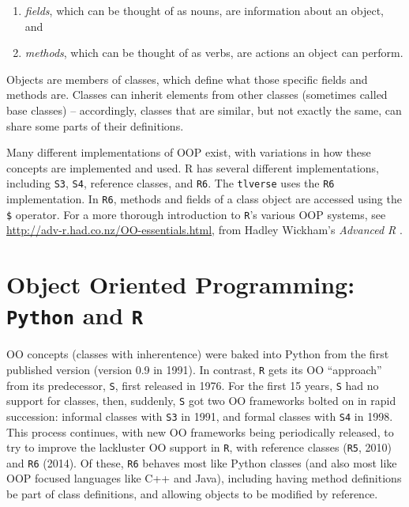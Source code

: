 \documentclass[
  12pt, krantz2,
]{krantz}
\newcommand{\passthrough}[1]{#1}
\providecommand{\tightlist}{%
  \setlength{\itemsep}{0pt}\setlength{\parskip}{0pt}}
\newcommand{\1}{\mathbbm{1}}
\theoremstyle{definition}
\theoremstyle{definition}
\theoremstyle{definition}
\theoremstyle{definition}
\theoremstyle{remark}
\begin{document}
\begin{enumerate}
\def\labelenumi{\arabic{enumi}.}
\tightlist
\item
  \emph{fields}, which can be thought of as nouns, are information about an object,
  and
\item
  \emph{methods}, which can be thought of as verbs, are actions an object can
  perform.
\end{enumerate}

Objects are members of classes, which define what those specific fields and
methods are. Classes can inherit elements from other classes (sometimes called
base classes) -- accordingly, classes that are similar, but not exactly the
same, can share some parts of their definitions.

Many different implementations of OOP exist, with variations in how these
concepts are implemented and used. R has several different implementations,
including \passthrough{\lstinline!S3!}, \passthrough{\lstinline!S4!}, reference classes, and \passthrough{\lstinline!R6!}. The \passthrough{\lstinline!tlverse!} uses the \passthrough{\lstinline!R6!}
implementation. In \passthrough{\lstinline!R6!}, methods and fields of a class object are accessed using
the \passthrough{\lstinline!$!} operator. For a more thorough introduction to \passthrough{\lstinline!R!}'s various OOP systems,
see \url{http://adv-r.had.co.nz/OO-essentials.html}, from Hadley Wickham's \emph{Advanced
R} \citep{wickham2014advanced}.

\hypertarget{object-oriented-programming-python-and-r}{%
\section{\texorpdfstring{Object Oriented Programming: \texttt{Python} and \texttt{R}}{Object Oriented Programming: Python and R}}\label{object-oriented-programming-python-and-r}}

OO concepts (classes with inherentence) were baked into Python from the first
published version (version 0.9 in 1991). In contrast, \passthrough{\lstinline!R!} gets its OO ``approach''
from its predecessor, \passthrough{\lstinline!S!}, first released in 1976. For the first 15 years, \passthrough{\lstinline!S!}
had no support for classes, then, suddenly, \passthrough{\lstinline!S!} got two OO frameworks bolted on
in rapid succession: informal classes with \passthrough{\lstinline!S3!} in 1991, and formal classes with
\passthrough{\lstinline!S4!} in 1998. This process continues, with new OO frameworks being periodically
released, to try to improve the lackluster OO support in \passthrough{\lstinline!R!}, with reference
classes (\passthrough{\lstinline!R5!}, 2010) and \passthrough{\lstinline!R6!} (2014). Of these, \passthrough{\lstinline!R6!} behaves most like Python
classes (and also most like OOP focused languages like C++ and Java), including
having method definitions be part of class definitions, and allowing objects to
be modified by reference.

  

\backmatter
\printindex
\end{document}
